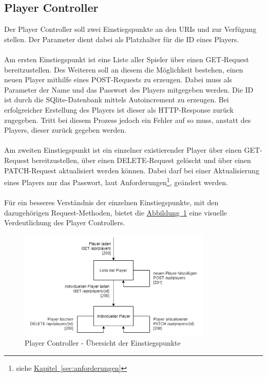 \subsection{Player Controller}\label{sec:playerController}
Der Player Controller soll zwei Einstiegspunkte an den \glspl{URI}  und  zur Verfügung stellen. Der Parameter  dient dabei als Platzhalter für die ID eines Players.\\
\\
Am ersten Einstiegspunkt ist eine Liste aller Spieler über einen GET-Request bereitzustellen. Des Weiteren soll an diesem die Möglichkeit bestehen, einen neuen Player mithilfe eines POST-Requests zu erzeugen. Dabei muss als Parameter der Name und das Passwort des Players mitgegeben werden. Die ID ist durch die SQlite-Datenbank mittels Autoincrement zu erzeugen. Bei erfolgreicher Erstellung des Players ist dieser als \gls{HTTP}-Response zurück zugegeben. Tritt bei diesem Prozess jedoch ein Fehler auf so muss, anstatt des Players, dieser zurück gegeben werden.\\
\\
Am zweiten Einstiegspunkt ist ein einzelner existierender Player über einen GET-Request bereitzustellen, über einen DELETE-Request gelöscht und über einen PATCH-Request aktualisiert werden können. Dabei darf bei einer Aktualisierung eines Players nur das Passwort, laut Anforderungen\footnote{siehe \hyperref[sec:anforderungen]{Kapitel~\ref{sec:anforderungen}}}, geändert werden.\\
\\
Für ein besseres Verständnis der einzelnen Einstiegspunkte, mit den dazugehörigen Request-Methoden, bietet die \hyperref[fig:playerController]{Abbildung~\ref{fig:playerController}} eine visuelle Verdeutlichung des Player Controllers.\\
\begin{figure}[htb]
	\includegraphics[width=0.816\textwidth]{images/player-controller.png}
	\caption{Player Controller - Übersicht der Einstiegspunkte}
	\label{fig:playerController}
\end{figure}

